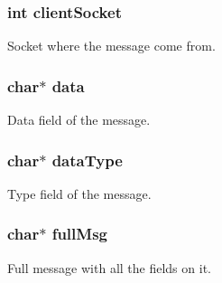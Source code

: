 \subsubsection[{\texorpdfstring{client\+Socket}{clientSocket}}]{\setlength{\rightskip}{0pt plus 5cm}int client\+Socket}\hypertarget{struct_m_e_s_s_a_g_e_adc5475d507e3d713ad405bbeb6eb41e7}{}\label{struct_m_e_s_s_a_g_e_adc5475d507e3d713ad405bbeb6eb41e7}


Socket where the message come from. 

\subsubsection[{\texorpdfstring{data}{data}}]{\setlength{\rightskip}{0pt plus 5cm}char$\ast$ data}\hypertarget{struct_m_e_s_s_a_g_e_a91a70b77df95bd8b0830b49a094c2acb}{}\label{struct_m_e_s_s_a_g_e_a91a70b77df95bd8b0830b49a094c2acb}


Data field of the message. 

\subsubsection[{\texorpdfstring{data\+Type}{dataType}}]{\setlength{\rightskip}{0pt plus 5cm}char$\ast$ data\+Type}\hypertarget{struct_m_e_s_s_a_g_e_afadf9093db8445aab513240c2461c615}{}\label{struct_m_e_s_s_a_g_e_afadf9093db8445aab513240c2461c615}


Type field of the message. 

\subsubsection[{\texorpdfstring{full\+Msg}{fullMsg}}]{\setlength{\rightskip}{0pt plus 5cm}char$\ast$ full\+Msg}\hypertarget{struct_m_e_s_s_a_g_e_acc701acfce6d5aefaf387fc3d681d72f}{}\label{struct_m_e_s_s_a_g_e_acc701acfce6d5aefaf387fc3d681d72f}


Full message with all the fields on it. 

